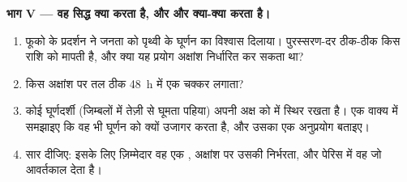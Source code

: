 \begin{problem}
\medskip
\noindent\textbf{भाग V --- वह सिद्ध क्या करता है, और और क्या-क्या करता है।}
\begin{enumerate}[resume]
  \item फूको के प्रदर्शन ने जनता को पृथ्वी के घूर्णन का विश्वास दिलाया।
        पुरस्सरण-दर ठीक-ठीक किस राशि को मापती है, और क्या यह प्रयोग
        अक्षांश निर्धारित कर सकता था?
  \item किस अक्षांश पर तल ठीक \qty{48}{h} में एक चक्कर लगाता?
  \item कोई घूर्णदर्शी (जिम्बलों में तेज़ी से घूमता पहिया) अपनी अक्ष को
         में स्थिर रखता है। एक वाक्य में समझाइए कि वह भी
        घूर्णन को क्यों उजागर करता है, और उसका एक अनुप्रयोग बताइए।
  \item सार दीजिए: इसके लिए ज़िम्मेदार वह एक , अक्षांश पर उसकी
        निर्भरता, और पेरिस में वह जो आवर्तकाल देता है।
\end{enumerate}
\end{problem}
